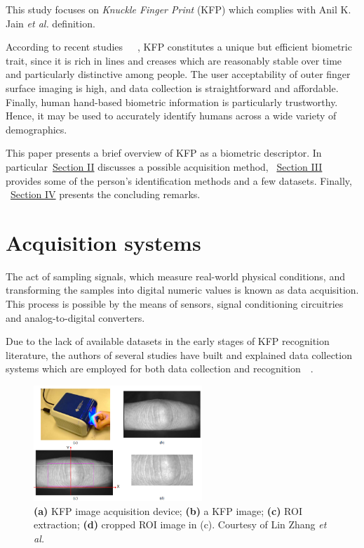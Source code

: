 \documentclass[journal]{IEEEtran}
\begin{document}
This study focuses on \emph{Knuckle Finger Print} (KFP) which complies with Anil K. Jain \textit{et al.} definition.

According to recent studies~\cite{Meraoumia}~\cite{KumarKnuckle}~\cite{LiWenwen}, KFP constitutes a unique but efficient biometric trait, since it is rich in lines and creases which are reasonably stable over time and particularly distinctive among people.
The user acceptability of outer finger surface imaging is high, and data collection is straightforward and affordable.
Finally, human hand-based biometric information is particularly trustworthy. Hence, it may be used to accurately identify humans across a wide variety of demographics.

This paper presents a brief overview of KFP as a biometric descriptor. In particular~\hyperref[sec:acquisitionsystems]{Section II} discusses a possible acquisition method, ~\hyperref[sec:recognitionalgorithms]{Section III} provides some of the person's identification methods and a few datasets. Finally, ~\hyperref[sec:conclusion]{Section IV} presents the concluding remarks.

\section{Acquisition systems}
\label{sec:acquisitionsystems}
The act of sampling signals, which measure real-world physical conditions, and transforming the samples into digital numeric values is known as data acquisition. This process is possible by the means of sensors, signal conditioning circuitries and analog-to-digital converters.

Due to the lack of available datasets in the early stages of KFP recognition literature, the authors of several studies have built and explained data collection systems which are employed for both data collection and recognition~\cite{Zhang1}~\cite{Kumar}.

\begin{figure}
    \centering
    \includegraphics[width=2.5in]{images/zhang_acquisition_system.png}
    \caption{\textbf{(a)} KFP image acquisition device; \textbf{(b)} a KFP image; \textbf{(c)} ROI extraction; \textbf{(d)} cropped ROI image in (c). Courtesy of Lin Zhang \textit{et al.}}
    \label{fig:zhang_acq_sys}
\end{figure}
\end{document}
